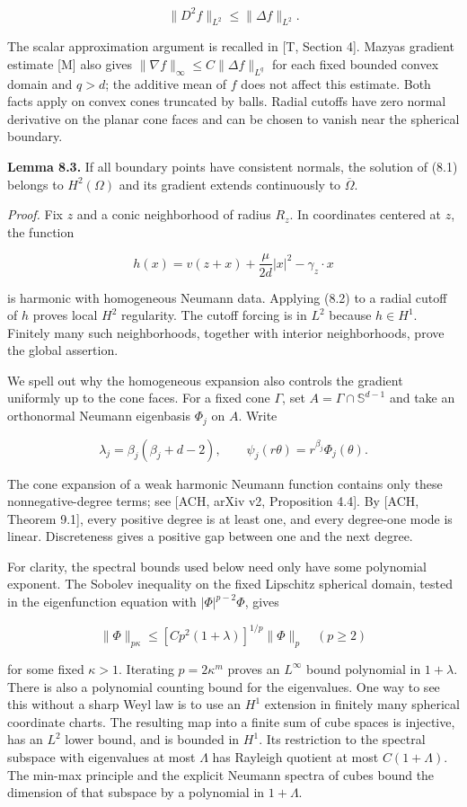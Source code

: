 \documentclass[11pt]{article}
\begin{document}
\[
\|D^2 f\|_{L^2}\le\|\Delta f\|_{L^2}.
\tag{8.2}
\]

The scalar approximation argument is recalled in {[}T, Section 4{]}.
Maz\textquotesingle ya\textquotesingle s gradient estimate {[}M{]} also
gives \(\|\nabla f\|_\infty\le C\|\Delta f\|_{L^q}\) for each fixed
bounded convex domain and \(q>d\); the additive mean of \(f\) does not
affect this estimate. Both facts apply on convex cones truncated by
balls. Radial cutoffs have zero normal derivative on the planar cone
faces and can be chosen to vanish near the spherical boundary.

\textbf{Lemma 8.3.} If all boundary points have consistent normals, the
solution of (8.1) belongs to \(H^2(\Omega)\) and its gradient extends
continuously to \(\overline\Omega\).

\emph{Proof.} Fix \(z\) and a conic neighborhood of radius \(R_z\). In
coordinates centered at \(z\), the function

\[
h(x)=v(z+x)+\frac{\mu}{2d}|x|^2-\gamma_z\cdot x
\tag{8.3}
\]

is harmonic with homogeneous Neumann data. Applying (8.2) to a radial
cutoff of \(h\) proves local \(H^2\) regularity. The cutoff forcing is
in \(L^2\) because \(h\in H^1\). Finitely many such neighborhoods,
together with interior neighborhoods, prove the global assertion.

We spell out why the homogeneous expansion also controls the gradient
uniformly up to the cone faces. For a fixed cone \(\Gamma\), set
\(A=\Gamma\cap\mathbb S^{d-1}\) and take an orthonormal Neumann
eigenbasis \(\Phi_j\) on \(A\). Write

\[
\lambda_j=\beta_j(\beta_j+d-2),\qquad
\psi_j(r\theta)=r^{\beta_j}\Phi_j(\theta).
\tag{8.4}
\]

The cone expansion of a weak harmonic Neumann function contains only
these nonnegative-degree terms; see {[}ACH, arXiv v2, Proposition
4.4{]}. By {[}ACH, Theorem 9.1{]}, every positive degree is at least
one, and every degree-one mode is linear. Discreteness gives a positive
gap between one and the next degree.

For clarity, the spectral bounds used below need only have some
polynomial exponent. The Sobolev inequality on the fixed Lipschitz
spherical domain, tested in the eigenfunction equation with
\(|\Phi|^{p-2}\Phi\), gives

\[
\|\Phi\|_{p\kappa}
 \le [C p^2(1+\lambda)]^{1/p}\|\Phi\|_p
\quad(p\ge2)
\tag{8.5}
\]

for some fixed \(\kappa>1\). Iterating \(p=2\kappa^m\) proves an
\(L^\infty\) bound polynomial in \(1+\lambda\). There is also a
polynomial counting bound for the eigenvalues. One way to see this
without a sharp Weyl law is to use an \(H^1\) extension in finitely many
spherical coordinate charts. The resulting map into a finite sum of cube
spaces is injective, has an \(L^2\) lower bound, and is bounded in
\(H^1\). Its restriction to the spectral subspace with eigenvalues at
most \(\Lambda\) has Rayleigh quotient at most \(C(1+\Lambda)\). The
min-max principle and the explicit Neumann spectra of cubes bound the
dimension of that subspace by a polynomial in \(1+\Lambda\).
\end{document}
